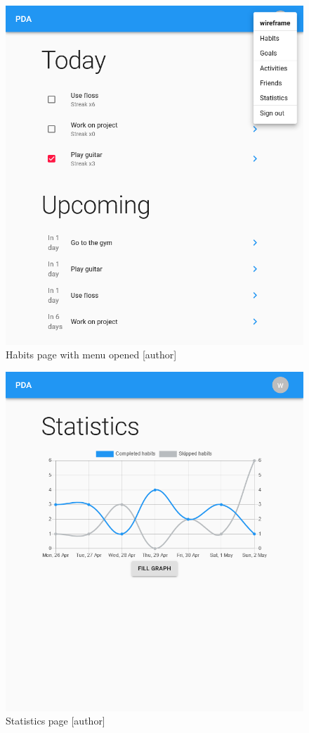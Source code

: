 \begin{figure}[h!]
    \includegraphics[width=1\textwidth]{images/habits-page-2}
    \caption{Habits page with menu opened [author]}\label{fig:figure3}
\end{figure}

\begin{figure}[h!]
    \includegraphics[width=1\textwidth]{images/statistics-page}
    \caption{Statistics page [author]}\label{fig:figure4}
\end{figure}
